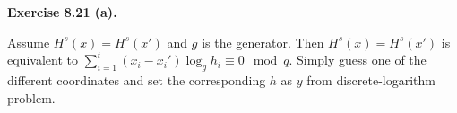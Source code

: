 \documentclass[a4paper]{article}
\newenvironment{exercise}[1]{
	\par
	\noindent\textbf{Exercise #1.}\quad
}{
	\par
	\bigskip
}
\begin{document}
\begin{exercise}{8.21 (a)}
    Assume $H^s(x)=H^s(x')$ and $g$ is the generator.
    Then $H^s(x)=H^s(x')$ is equivalent to $\sum_{i=1}^t (x_i-x_i')\log_g h_i\equiv 0\mod q$.
    Simply guess one of the different coordinates and set the corresponding $h$ as $y$ from discrete-logarithm problem.
\end{exercise}
\end{document}
